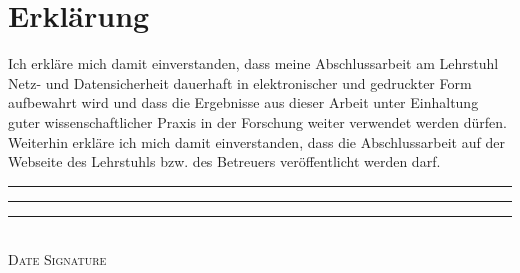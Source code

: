 \cleardoublepage

\section*{Erklärung}
{
Ich erkläre mich damit einverstanden, dass meine Abschlussarbeit am
Lehrstuhl Netz- und Datensicherheit dauerhaft in elektronischer und gedruckter Form aufbewahrt
wird und dass die Ergebnisse aus dieser Arbeit unter Einhaltung guter
wissenschaftlicher Praxis in der Forschung weiter verwendet werden dürfen.
Weiterhin erkläre ich mich damit einverstanden, dass die Abschlussarbeit auf der Webseite des Lehrstuhls bzw. des Betreuers veröffentlicht werden darf.\@}

\makeatletter
\vspace{2cm}
\rule{3cm}{0.1pt} \hfill \rule{6cm}{0.1pt} \hfill \rule{3cm}{0.1pt}\\
\hspace*{1cm} \textsc{Date} \hspace*{2.7cm} \textsc{\@author} \hspace*{2.2cm} \textsc{Signature}
\makeatother

\cleardoublepage

\pagestyle{scrheadings} %

\tableofcontents

\cleardoublepage
